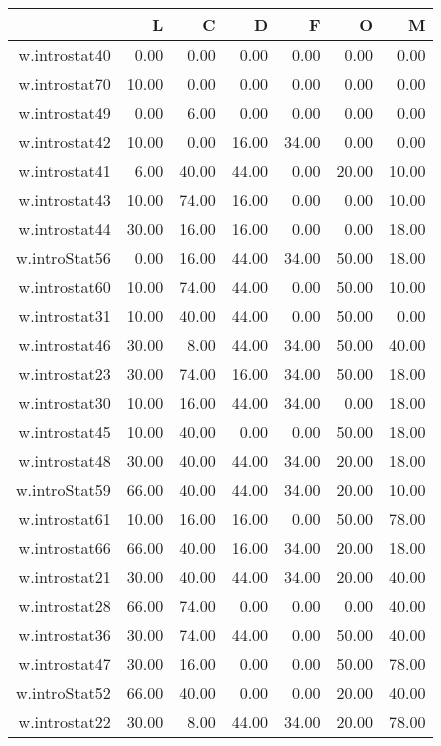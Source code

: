 \documentclass[12pt,english,nohyper]{tufte-handout}\usepackage[]{graphicx}\usepackage[]{color}
\begin{document}
\begin{longtable}{rrrrrrr}
  \hline
 & L & C & D & F & O & M \\ 
  \hline
w.introstat40 & 0.00 & 0.00 & 0.00 & 0.00 & 0.00 & 0.00 \\ 
  w.introstat70 & 10.00 & 0.00 & 0.00 & 0.00 & 0.00 & 0.00 \\ 
  w.introstat49 & 0.00 & 6.00 & 0.00 & 0.00 & 0.00 & 0.00 \\ 
  w.introstat42 & 10.00 & 0.00 & 16.00 & 34.00 & 0.00 & 0.00 \\ 
  w.introstat41 & 6.00 & 40.00 & 44.00 & 0.00 & 20.00 & 10.00 \\ 
  w.introstat43 & 10.00 & 74.00 & 16.00 & 0.00 & 0.00 & 10.00 \\ 
  w.introstat44 & 30.00 & 16.00 & 16.00 & 0.00 & 0.00 & 18.00 \\ 
  w.introStat56 & 0.00 & 16.00 & 44.00 & 34.00 & 50.00 & 18.00 \\ 
  w.introstat60 & 10.00 & 74.00 & 44.00 & 0.00 & 50.00 & 10.00 \\ 
  w.introstat31 & 10.00 & 40.00 & 44.00 & 0.00 & 50.00 & 0.00 \\ 
  w.introstat46 & 30.00 & 8.00 & 44.00 & 34.00 & 50.00 & 40.00 \\ 
  w.introstat23 & 30.00 & 74.00 & 16.00 & 34.00 & 50.00 & 18.00 \\ 
  w.introstat30 & 10.00 & 16.00 & 44.00 & 34.00 & 0.00 & 18.00 \\ 
  w.introstat45 & 10.00 & 40.00 & 0.00 & 0.00 & 50.00 & 18.00 \\ 
  w.introstat48 & 30.00 & 40.00 & 44.00 & 34.00 & 20.00 & 18.00 \\ 
  w.introStat59 & 66.00 & 40.00 & 44.00 & 34.00 & 20.00 & 10.00 \\ 
  w.introstat61 & 10.00 & 16.00 & 16.00 & 0.00 & 50.00 & 78.00 \\ 
  w.introstat66 & 66.00 & 40.00 & 16.00 & 34.00 & 20.00 & 18.00 \\ 
  w.introstat21 & 30.00 & 40.00 & 44.00 & 34.00 & 20.00 & 40.00 \\ 
  w.introstat28 & 66.00 & 74.00 & 0.00 & 0.00 & 0.00 & 40.00 \\ 
  w.introstat36 & 30.00 & 74.00 & 44.00 & 0.00 & 50.00 & 40.00 \\ 
  w.introstat47 & 30.00 & 16.00 & 0.00 & 0.00 & 50.00 & 78.00 \\ 
  w.introStat52 & 66.00 & 40.00 & 0.00 & 0.00 & 20.00 & 40.00 \\ 
  w.introstat22 & 30.00 & 8.00 & 44.00 & 34.00 & 20.00 & 78.00 \\ 

\end{longtable}
\end{document}
